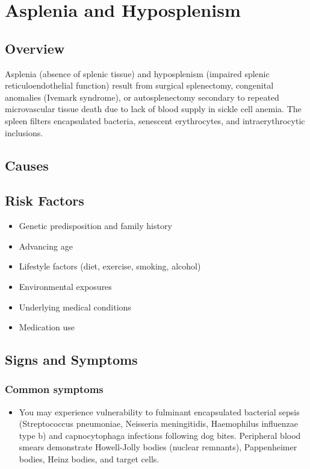 \chapter{Asplenia and Hyposplenism}
\label{sec:Asplenia and Hyposplenism}

\section{Overview}
Asplenia (absence of splenic tissue) and hyposplenism (impaired splenic reticuloendothelial function) result from surgical splenectomy, congenital anomalies (Ivemark syndrome), or autosplenectomy secondary to repeated microvascular tissue death due to lack of blood supply in sickle cell anemia. The spleen filters encapsulated bacteria, senescent erythrocytes, and intraerythrocytic inclusions.
\section{Causes}
\section{Risk Factors}

\begin{itemize}[noitemsep]
  \item Genetic predisposition and family history
  \item Advancing age
  \item Lifestyle factors (diet, exercise, smoking, alcohol)
  \item Environmental exposures
  \item Underlying medical conditions
  \item Medication use
\end{itemize}
\section{Signs and Symptoms}

\subsection{Common symptoms}
\begin{itemize}[noitemsep]
  \item You may experience vulnerability to fulminant encapsulated bacterial sepsis (Streptococcus pneumoniae, Neisseria meningitidis, Haemophilus influenzae type b) and capnocytophaga infections following dog bites. Peripheral blood smears demonstrate Howell-Jolly bodies (nuclear remnants), Pappenheimer bodies, Heinz bodies, and target cells. 
  \end{itemize}

